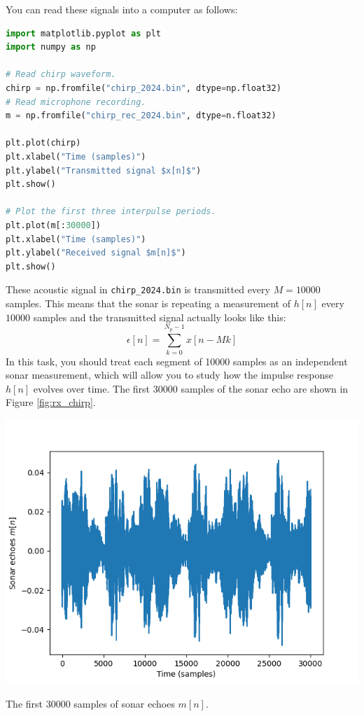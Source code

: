You can read these signals into a
computer as follows:
\begin{lstlisting}[language=Python, numbers=none]
import matplotlib.pyplot as plt
import numpy as np

# Read chirp waveform.
chirp = np.fromfile("chirp_2024.bin", dtype=np.float32)
# Read microphone recording.
m = np.fromfile("chirp_rec_2024.bin", dtype=n.float32)

plt.plot(chirp)
plt.xlabel("Time (samples)")
plt.ylabel("Transmitted signal $x[n]$")
plt.show()

# Plot the first three interpulse periods.
plt.plot(m[:30000])
plt.xlabel("Time (samples)")
plt.ylabel("Received signal $m[n]$")
plt.show()
\end{lstlisting}
These acoustic signal in \verb|chirp_2024.bin| is transmitted every
$M=10000$ samples. This means that the sonar is repeating a
measurement of $h[n]$ every $10000$ samples and the transmitted signal
actually looks like this:
\begin{equation}
  \epsilon[n] = \sum_{k=0}^{N_p-1} x[n - Mk]
\end{equation}
In this task, you should treat each segment of 10000 samples as an
independent sonar measurement, which will allow you to study how the
impulse response $h[n]$ evolves over time. The first 30000 samples of the sonar echo are shown in Figure \ref{fig:rx_chirp}.
\begin{marginfigure}
  \begin{center}
    \includegraphics[width=\textwidth]{Assignments/figures/chirp_rec_2024.png}
  \end{center}
  \caption{The first 30000 samples of sonar echoes $m[n]$.}
  \label{fig:rx_chirp}
\end{marginfigure}

